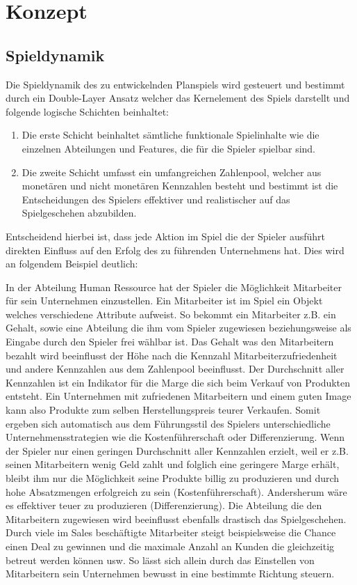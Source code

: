 \section{Konzept}
\subsection{Spieldynamik}
Die Spieldynamik des zu entwickelnden Planspiels wird gesteuert und bestimmt durch ein Double-Layer Ansatz welcher das Kernelement des Spiels darstellt und folgende logische Schichten beinhaltet:
\begin{enumerate}
\item Die erste Schicht beinhaltet sämtliche funktionale Spielinhalte wie die einzelnen Abteilungen und Features, die für die Spieler spielbar sind.
\item Die zweite Schicht umfasst ein umfangreichen Zahlenpool, welcher aus monetären und nicht monetären Kennzahlen besteht und bestimmt ist die Entscheidungen des Spielers effektiver und realistischer auf das Spielgeschehen abzubilden.
\end{enumerate}
Entscheidend hierbei ist, dass jede Aktion im Spiel die der Spieler ausführt direkten Einfluss auf den Erfolg des zu führenden Unternehmens hat. Dies wird an folgendem Beispiel deutlich:
\par In der Abteilung Human Ressource hat der Spieler die Möglichkeit Mitarbeiter für sein Unternehmen einzustellen. Ein Mitarbeiter ist im Spiel ein Objekt welches verschiedene Attribute aufweist. So bekommt ein Mitarbeiter z.B. ein Gehalt, sowie eine Abteilung die ihm vom Spieler zugewiesen beziehungsweise als Eingabe durch den Spieler frei wählbar ist. Das Gehalt was den Mitarbeitern bezahlt wird beeinflusst der Höhe nach die Kennzahl Mitarbeiterzufriedenheit und andere Kennzahlen aus dem Zahlenpool beeinflusst. Der Durchschnitt aller Kennzahlen ist ein Indikator für die Marge die sich beim Verkauf von Produkten entsteht. Ein Unternehmen mit zufriedenen Mitarbeitern und einem guten Image kann also Produkte zum selben Herstellungspreis teurer Verkaufen. Somit ergeben sich automatisch aus dem Führungsstil des Spielers unterschiedliche Unternehmensstrategien wie die Kostenführerschaft oder Differenzierung. Wenn der Spieler nur einen geringen Durchschnitt aller Kennzahlen erzielt, weil er z.B. seinen Mitarbeitern wenig Geld zahlt und folglich eine geringere Marge erhält, bleibt ihm nur die Möglichkeit seine Produkte billig zu produzieren und durch hohe Absatzmengen erfolgreich zu sein (Kostenführerschaft). Andersherum wäre es effektiver teuer zu produzieren (Differenzierung). Die Abteilung die den Mitarbeitern zugewiesen wird beeinflusst ebenfalls drastisch das Spielgeschehen. Durch viele im Sales beschäftigte Mitarbeiter steigt beispielsweise die Chance einen Deal zu gewinnen und die maximale Anzahl an Kunden die gleichzeitig betreut werden können usw. So lässt sich allein durch das Einstellen von Mitarbeitern sein Unternehmen bewusst in eine bestimmte Richtung steuern.
